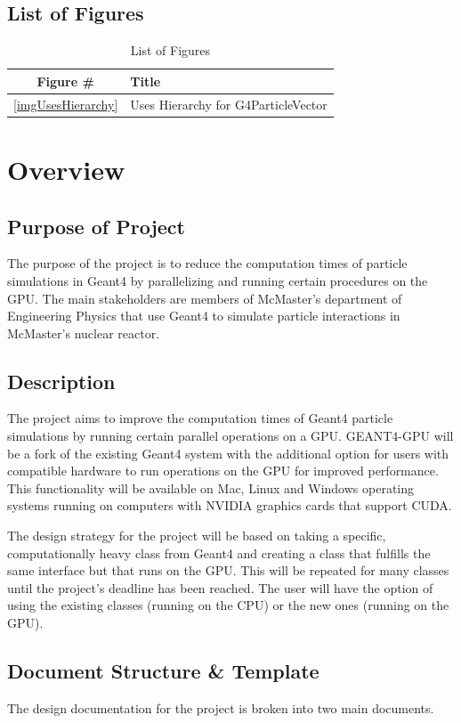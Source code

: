 \documentclass[12pt]{article}
\begin{document}
\subsection{List of Figures}

\begin{table}[h]
\centering
\caption{List of Figures}\label{Table_Figures}
\begin{tabular}{cl}
\toprule
\bf Figure \# & \bf Title\\\midrule
\ref{imgUsesHierarchy} & Uses Hierarchy for G4ParticleVector\\
\bottomrule
\end{tabular}
\end{table}

\section{Overview}
\subsection{Purpose of Project}
The purpose of the project is to reduce the computation times of particle simulations in Geant4 by parallelizing and running certain procedures on the GPU. The main stakeholders are members of McMaster's department of Engineering Physics that use Geant4 to simulate particle interactions in McMaster's nuclear reactor.

\subsection{Description}
The project aims to improve the computation times of Geant4 particle simulations by running certain parallel operations on a GPU. GEANT4-GPU will be a fork of the existing Geant4 system with the additional option for users with compatible hardware to run operations on the GPU for improved performance. This functionality will be available on Mac, Linux and Windows operating systems running on computers with NVIDIA graphics cards that support CUDA.

The design strategy for the project will be based on taking a specific, computationally heavy class from Geant4 and creating a class that fulfills the same interface but that runs on the GPU. This will be repeated for many classes until the project's deadline has been reached. The user will have the option of using the existing classes (running on the CPU) or the new ones (running on the GPU).

\subsection{Document Structure \& Template}
The design documentation for the project is broken into two main documents.
\end{document}
